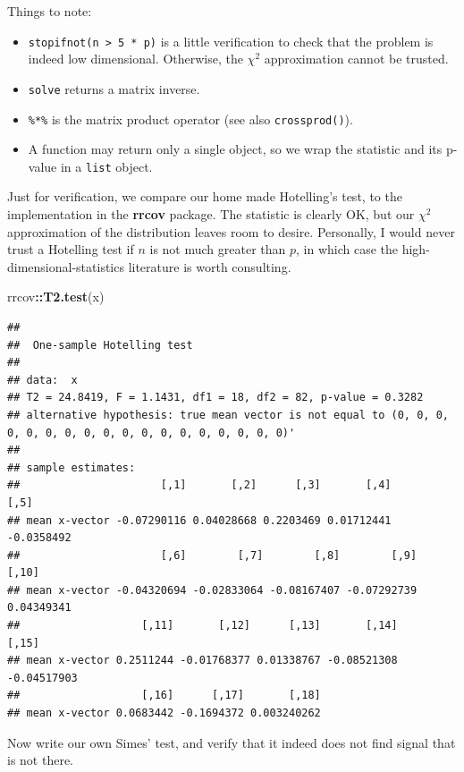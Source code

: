 \documentclass[]{book}
\newenvironment{Shaded}{\begin{snugshade}}{\end{snugshade}}
\newcommand{\KeywordTok}[1]{\textcolor[rgb]{0.13,0.29,0.53}{\textbf{#1}}}
\newcommand{\NormalTok}[1]{#1}
\newcommand{\OperatorTok}[1]{\textcolor[rgb]{0.81,0.36,0.00}{\textbf{#1}}}
\providecommand{\tightlist}{%
  \setlength{\itemsep}{0pt}\setlength{\parskip}{0pt}}
\theoremstyle{definition}
\theoremstyle{definition}
\theoremstyle{definition}
\theoremstyle{remark}
\begin{document}
Things to note:

\begin{itemize}
\tightlist
\item
  \texttt{stopifnot(n\ \textgreater{}\ 5\ *\ p)} is a little verification to check that the problem is indeed low dimensional. Otherwise, the \(\chi^2\) approximation cannot be trusted.
\item
  \texttt{solve} returns a matrix inverse.
\item
  \texttt{\%*\%} is the matrix product operator (see also \texttt{crossprod()}).
\item
  A function may return only a single object, so we wrap the statistic and its p-value in a \texttt{list} object.
\end{itemize}

Just for verification, we compare our home made Hotelling's test, to the implementation in the \textbf{rrcov} package.
The statistic is clearly OK, but our \(\chi^2\) approximation of the distribution leaves room to desire.
Personally, I would never trust a Hotelling test if \(n\) is not much greater than \(p\), in which case the high-dimensional-statistics literature is worth consulting.

\begin{Shaded}
\begin{Highlighting}[]
\NormalTok{rrcov}\OperatorTok{::}\KeywordTok{T2.test}\NormalTok{(x)}
\end{Highlighting}
\end{Shaded}

\begin{verbatim}
## 
##  One-sample Hotelling test
## 
## data:  x
## T2 = 24.8419, F = 1.1431, df1 = 18, df2 = 82, p-value = 0.3282
## alternative hypothesis: true mean vector is not equal to (0, 0, 0, 0, 0, 0, 0, 0, 0, 0, 0, 0, 0, 0, 0, 0, 0, 0)' 
## 
## sample estimates:
##                      [,1]       [,2]      [,3]       [,4]       [,5]
## mean x-vector -0.07290116 0.04028668 0.2203469 0.01712441 -0.0358492
##                      [,6]        [,7]        [,8]        [,9]      [,10]
## mean x-vector -0.04320694 -0.02833064 -0.08167407 -0.07292739 0.04349341
##                   [,11]       [,12]      [,13]       [,14]       [,15]
## mean x-vector 0.2511244 -0.01768377 0.01338767 -0.08521308 -0.04517903
##                   [,16]      [,17]       [,18]
## mean x-vector 0.0683442 -0.1694372 0.003240262
\end{verbatim}

Now write our own Simes' test, and verify that it indeed does not find signal that is not there.
\end{document}
